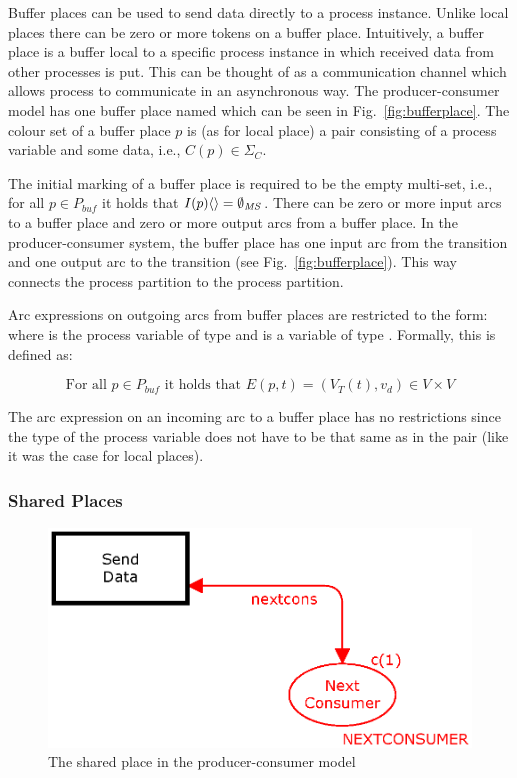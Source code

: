 Buffer places can be used to send data directly to a process instance. Unlike local places there can be zero or more tokens on a buffer place. Intuitively, a buffer place is a buffer local to a specific process instance in which received data from other processes is put. This can be thought of as a communication channel which allows process to communicate in an asynchronous way. The producer-consumer model has one buffer place named  which can be seen in Fig.~\ref{fig:bufferplace}. The colour set of a buffer place $p$ is (as for local place) a pair consisting of a process variable and some data, i.e., $C(p) \in \Sigma_{C}$. 

The initial marking of a buffer place is required to be the empty multi-set, i.e., for all $p \in P_{buf}$ it holds that $I(p)\langle \rangle = \emptyset_{\mathit{MS}}$. There can be zero or more input arcs to a buffer place and zero or more output arcs from a buffer place. In the producer-consumer system, the buffer place  has one input arc from the transition  and one output arc to the transition  (see Fig.~\ref{fig:bufferplace}). This way  connects the  process partition to the  process partition. 

Arc expressions on outgoing arcs from buffer places are restricted to the form:  where  is the process variable of type  and  is a variable of type . Formally, this is defined as:

\begin{displaymath}
\text{For all } p \in P_{buf} \text{ it holds that } E(p, t) = (V_{T}(t), v_{d}) \in V \times V
\end{displaymath}

\noindent
The arc expression on an incoming arc to a buffer place has no restrictions since the type of the process variable does not have to be that same as  in the pair  (like it was the case for local places).

\subsubsection{Shared Places}

\begin{figure}
\centering
\includegraphics[scale=0.45]{netclass/graphics/shared_place.eps}
\caption{The shared place  in the producer-consumer model}
\label{fig:sharedplace}
\end{figure}

